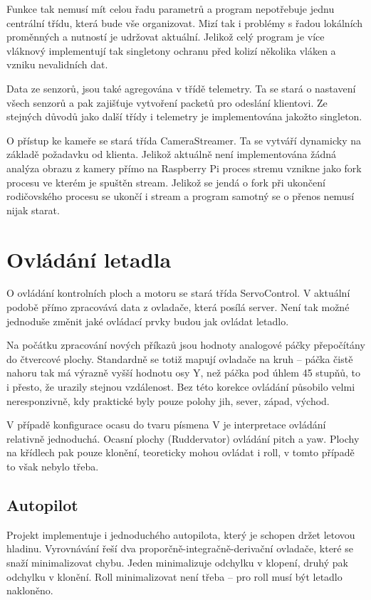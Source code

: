 \documentclass[a4paper,oneside,12pt]{report}
\begin{document}
Funkce tak nemusí mít celou řadu parametrů a program nepotřebuje jednu centrální třídu, která bude vše organizovat.
Mizí tak i problémy s řadou lokálních proměnných a nutností je udržovat aktuální.
Jelikož celý program je více vláknový implementují tak singletony ochranu před kolizí několika vláken a vzniku nevalidních dat.

Data ze senzorů, jsou také agregována v třídě telemetry.
Ta se stará o nastavení všech senzorů a pak zajišťuje vytvoření packetů pro odeslání klientovi.
Ze stejných důvodů jako další třídy i telemetry je implementována jakožto singleton.

O přístup ke kameře se stará třída CameraStreamer.
Ta se vytváří dynamicky na základě požadavku od klienta.
Jelikož aktuálně není implementována žádná analýza obrazu z kamery přímo na Raspberry Pi proces stremu vznikne jako fork procesu ve kterém je spuštěn stream.
Jelikož se jendá o fork při ukončení rodičovského procesu se ukončí i stream a program samotný se o přenos nemusí nijak starat.

\section{Ovládání letadla}

O ovládání kontrolních ploch a motoru se stará třída ServoControl.
V aktuální podobě přímo zpracovává data z ovladače, která posílá server.
Není tak možné jednoduše změnit jaké ovládací prvky budou jak ovládat letadlo.

Na počátku zpracování nových příkazů jsou hodnoty analogové páčky přepočítány do čtvercové plochy.
Standardně se totiž mapují ovladače na kruh -- páčka čistě nahoru tak má výrazně vyšší hodnotu osy Y, než páčka pod úhlem 45 stupňů, to i přesto, že urazily stejnou vzdálenost.
Bez této korekce ovládání působilo velmi neresponzivně, kdy praktické byly pouze polohy jih, sever, západ, východ.

V případě konfigurace ocasu do tvaru písmena V je interpretace ovládání relativně jednoduchá.
Ocasní plochy (Ruddervator) ovládání pitch a yaw.
Plochy na křídlech pak pouze klonění, teoreticky mohou ovládat i roll, v tomto případě to však nebylo třeba.

\subsection{Autopilot}

Projekt implementuje i jednoduchého autopilota, který je schopen držet letovou hladinu.
Vyrovnávání řeší dva proporčně-integračně-derivační ovladače, které se snaží minimalizovat chybu.
Jeden minimalizuje odchylku v klopení, druhý pak odchylku v klonění.
Roll minimalizovat není třeba -- pro roll musí být letadlo nakloněno.
\end{document}
